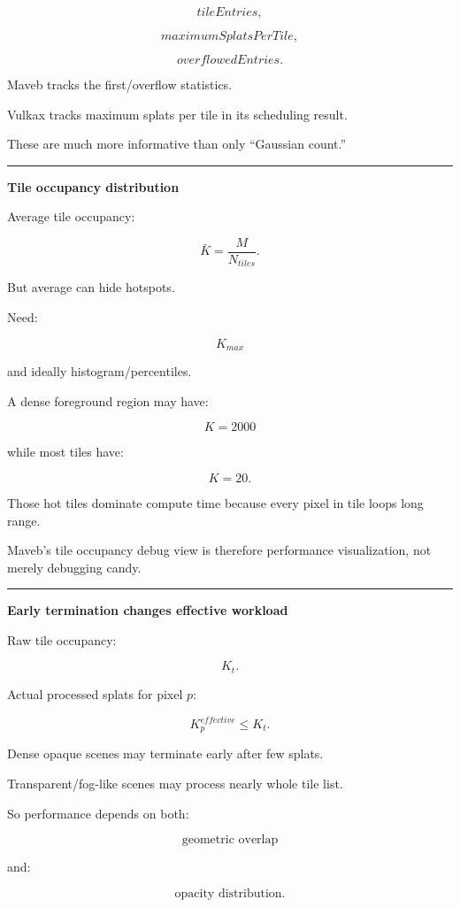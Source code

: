 \[
tileEntries,
\]

\[
maximumSplatsPerTile,
\]

\[
overflowedEntries.
\]

Maveb tracks the first/overflow statistics.

Vulkax tracks maximum splats per tile in its scheduling result.

These are much more informative than only ``Gaussian count.''

\begin{center}\rule{0.5\linewidth}{0.5pt}\end{center}

\textbf{Tile occupancy distribution}

Average tile occupancy:

\[
\bar K
=
\frac{
M
}{
N_{tiles}
}.
\]

But average can hide hotspots.

Need:

\[
K_{max}
\]

and ideally histogram/percentiles.

A dense foreground region may have:

\[
K=2000
\]

while most tiles have:

\[
K=20.
\]

Those hot tiles dominate compute time because every pixel in tile loops long range.

Maveb's tile occupancy debug view is therefore performance visualization, not merely debugging candy.

\begin{center}\rule{0.5\linewidth}{0.5pt}\end{center}

\textbf{Early termination changes effective workload}

Raw tile occupancy:

\[
K_t.
\]

Actual processed splats for pixel \(p\):

\[
K_p^{effective}
\le
K_t.
\]

Dense opaque scenes may terminate early after few splats.

Transparent/fog-like scenes may process nearly whole tile list.

So performance depends on both:

\[
\boxed{
\text{geometric overlap}
}
\]

and:

\[
\boxed{
\text{opacity distribution}.
}
\]

